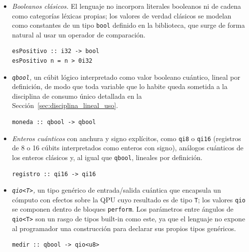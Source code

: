 \begin{itemize}
  \item \textit{Booleanos clásicos.} El lenguaje no incorpora literales booleanos ni de cadena como categorías léxicas propias; los valores de verdad clásicos se modelan como constantes de un tipo \lstinline|bool| definido en la biblioteca, que surge de forma natural al usar un operador de comparación.

\begin{lstlisting}[language={}, caption=El tipo bool como resultado de una comparación]
esPositivo :: i32 -> bool
esPositivo n = n > 0i32
\end{lstlisting}

  \item \textit{\lstinline|qbool|,} un cúbit lógico interpretado como valor booleano cuántico, lineal por definición, de modo que toda variable que lo habite queda sometida a la disciplina de consumo único detallada en la Sección~\ref{sec:disciplina_lineal_uso}.

\begin{lstlisting}[language={}, caption=Firma de una función sobre qbool]
moneda :: qbool -> qbool
\end{lstlisting}

  \item \textit{Enteros cuánticos} con anchura y signo explícitos, como \lstinline|qi8| o \lstinline|qi16| (registros de 8 o 16 cúbits interpretados como enteros con signo), análogos cuánticos de los enteros clásicos y, al igual que \lstinline|qbool|, lineales por definición.

\begin{lstlisting}[language={}, caption=Firma de una función sobre un entero cuántico]
registro :: qi16 -> qi16
\end{lstlisting}

  \item \textit{\lstinline|qio<T>|,} un tipo genérico de entrada/salida cuántica que encapsula un cómputo con efectos sobre la QPU cuyo resultado es de tipo \lstinline|T|; los valores \lstinline|qio| se componen dentro de bloques \lstinline|perform|. Los parámetros entre ángulos de \lstinline|qio<T>| son un rasgo de tipos built-in como este, ya que el lenguaje no expone al programador una construcción para declarar sus propios tipos genéricos.

\begin{lstlisting}[language={}, caption=Firma de una medición que produce un resultado clásico envuelto en qio]
medir :: qbool -> qio<u8>
\end{lstlisting}


\end{itemize}
